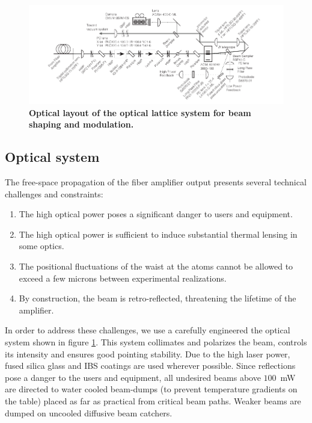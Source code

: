 \documentclass[twocolumn,aps,pra,showpacs,preprintnumbers,bibnotes]{revtex4-1}
\begin{document}
\begin{figure}
  \begin{center}
    \includegraphics{fig/optical_layout_wide.pdf}
    \caption{\textbf{Optical layout of the optical lattice system for beam shaping and modulation.}}\label{fig:optical_layout}
  \end{center}
\end{figure}

\subsection{Optical system}
The free-space propagation of the fiber amplifier output presents several technical challenges and constraints:
\begin{enumerate}
  \item The high optical power poses a significant danger to users and equipment.
  \item The high optical power is sufficient to induce substantial thermal lensing in some optics. 
  \item The positional fluctuations of the waist at the atoms cannot be allowed to exceed a few microns between experimental realizations.
\item By construction, the beam is retro-reflected, threatening the lifetime of the amplifier. 
  \end{enumerate}

In order to address these challenges, we use a carefully engineered the optical system shown in figure \ref{fig:optical_layout}.
This system collimates and polarizes the beam, controls its intensity and ensures good pointing stability.
Due to the high laser power, fused silica glass and IBS coatings are used wherever possible.
Since reflections pose a danger to the users and equipment, all undesired beams above $100\,$ mW are directed to water cooled beam-dumps (to prevent temperature gradients on the table) placed as far as practical from critical beam paths.
Weaker beams are dumped on uncooled diffusive beam catchers.
\end{document}
